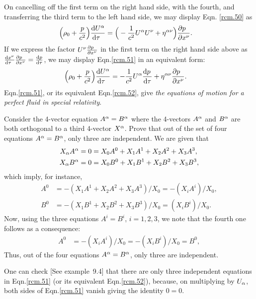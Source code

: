On cancelling off the first term   on the right hand side, 
with the fourth, and transferring the third term  to the 
left hand side, we may display Eqn. \eqref{rcm.50} as
\begin{align}\label{rcm.51}
\Big(\rho_0+ \frac{p}{c^2}\Big)
\frac{\mathrm{d} U^{{\alpha}}}{\mathrm{d} {\tau}\;\:}&=
\Big(-\frac{1}{c^2}U^{{\alpha}} U^{{\nu}}
+\eta^{{\alpha}{\nu}}\Big)\frac{{\partial} p\;\;}{{\partial} x^{{\nu}}}.
\end{align}
If we express the factor $U^{{\nu}} \frac{{\partial} p\;\;}{{\partial} 
x^{{\nu}}}$ in the first term on the right hand side above as 
$\frac{\mathrm{d} x^{{\nu}}}{\mathrm{d}{\tau}\;\:}\frac{{\partial} p\;\;}{{\partial} 
x^{{\nu}}}=\frac{\mathrm{d} p} {\mathrm{d}{\tau}}$, we may  display 
Eqn.\eqref{rcm.51} in an equivalent form:
\begin{align}\label{rcm.52}
\Big(\rho_0+ \frac{p}{c^2}\Big)\frac{\mathrm{d} 
U^{{\alpha}}}{\mathrm{d}{\tau}\;\:}&=
-\frac{1}{c^2}U^{{\alpha}} \frac{\mathrm{d} p\,}{\mathrm{d}{\tau}} +
\eta^{{\alpha}{\nu}}\frac{{\partial} p\;\;}{{\partial} x^{{\nu}}}.
\end{align}
Eqn.\eqref{rcm.51}, or its equivalent Eqn.\eqref{rcm.52}, 
give
 \textsl{the equations of motion for a perfect fluid in
special relativity}.

\exm Consider the 4-vector equation $A^{{\alpha}}= B^{{\alpha}}$ where 
the 4-vectors $A^{{\alpha}}$ and $B^{{\alpha}}$ are both orthogonal to 
a 
third 4-vector $X^{{\alpha}}$. Prove that out of the set of four  
equations $A^{{\alpha}}= B^{{\alpha}}$, only three are independent. 
\soln We are given that
\begin{align*}
X_{{\alpha}} A^{{\alpha}}&=0=X_0 A^0+X_1 A^1+X_2 A^2+X_3 A^3,\\
X_{{\alpha}} B^{{\alpha}}&=0=X_0 B^0+X_1 B^1+X_2 B^2+X_3 B^3,
\end{align*}
which imply, for instance,
\begin{align*}
A^0&=-(X_1 A^1+X_2 A^2+X_3 A^3)/X_0=-(X_i A^i)/X_0,\\
B^0&=-(X_1 B^1+X_2 B^2+X_3 B^3)/X_0=(X_i B^i)/X_0.
\end{align*}
Now, using the {three} equations $A^i= B^i$, $i=1,2,3$,
we note that the fourth one follows as a consequence:
\begin{align*}
A^0&=-(X_i A^i)/X_0 =-(X_i B^i)/X_0=B^0,
\end{align*}
Thus, out of the four
equations $A^{{\alpha}}= B^{{\alpha}}$, only three are independent.
\ebxns

One can check [See example~9.4] that there are only {three 
independent equations} in Eqn.\eqref{rcm.51} (or its  
equivalent Eqn.\eqref{rcm.52}), because, on multiplying by 
$U_{{\alpha}}$, both sides of Eqn.\eqref{rcm.51} vanish giving 
the 
identity $0=0$.

